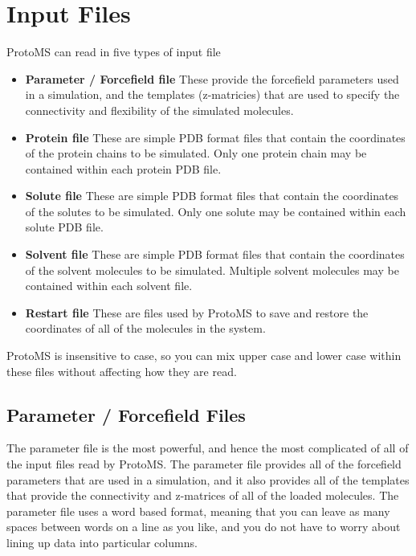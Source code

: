 \documentclass[letterpaper,10pt,english]{manual}
\begin{document}
\chapter{Input Files}

ProtoMS can read in five types of input file
\begin{itemize}
\item {} 
\textbf{Parameter / Forcefield file} These provide the forcefield parameters used in a simulation, and the templates (z-matricies) that are used to specify the connectivity and flexibility of the simulated molecules.

\item {} 
\textbf{Protein file} These are simple PDB format files that contain the coordinates of the protein chains to be simulated. Only one protein chain may be contained within each protein PDB file.

\item {} 
\textbf{Solute file} These are simple PDB format files that contain the coordinates of the solutes to be simulated. Only one solute may be contained within each solute PDB file.

\item {} 
\textbf{Solvent file} These are simple PDB format files that contain the coordinates of the solvent molecules to be simulated. Multiple solvent molecules may be contained within each solvent file.

\item {} 
\textbf{Restart file} These are files used by ProtoMS to save and restore the coordinates of all of the molecules in the system.

\end{itemize}

ProtoMS is insensitive to case, so you can mix upper case and lower case within these files without affecting how
they are read.


\hypertarget{parfil}{}\section{Parameter / Forcefield Files}

The parameter file is the most powerful, and hence the most complicated of all of the input files read by ProtoMS. The parameter file provides all of the forcefield parameters that are used in a simulation, and it also provides all of the templates that provide the connectivity and z-matrices of all of the loaded molecules. The parameter file uses a word based format, meaning that you can leave as many spaces between words on a line as you like, and you do not have to worry about lining up data into particular columns.
\end{document}
